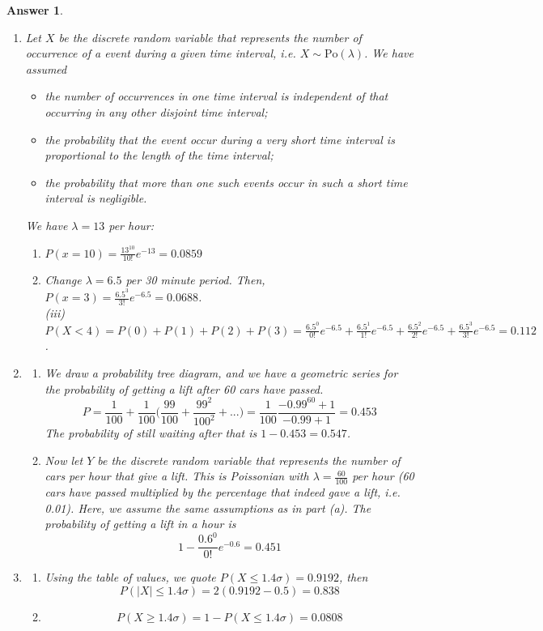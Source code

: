 \documentclass[a4paper]{article}
\newtheorem{ans}{Answer}[section]
\theoremstyle{new}
\begin{document}
\begin{ans}\leavevmode
\begin{enumerate}[label=(\alph*)]
\item Let $X$ be the discrete random variable that represents the number of occurrence of a event during a given time interval, i.e. $X\sim\text{Po}(\lambda)$. We have assumed
\begin{itemize}
    \item the number of occurrences in one time interval is independent of that occurring in any other disjoint time interval;
    \item the probability that the event occur during a very short time interval is proportional to the length of the time interval;
    \item the probability that more than one such events occur in such a short time interval is negligible.
\end{itemize}
We have $\lambda=13$ per hour:
\begin{enumerate}[label=(\roman*)]
\item $P(x=10)=\frac{13^{10}}{10!}e^{-13}=0.0859$\\[5pt]
\item Change $\lambda=6.5$ per 30 minute period. Then, $P(x=3)=\frac{6.5^3}{3!}e^{-6.5}=0.0688$.\\[5pt]
(iii) $P(X<4)=P(0)+P(1)+P(2)+P(3)=\frac{6.5^0}{0!}e^{-6.5}+\frac{6.5^1}{1!}e^{-6.5}+\frac{6.5^2}{2!}e^{-6.5}+\frac{6.5^3}{3!}e^{-6.5}=0.112$.
\end{enumerate}
\item
\begin{enumerate}[label=(\roman*)]
\item We draw a probability tree diagram, and we have a geometric series for the probability of getting a lift after 60 cars have passed.
$$P=\frac{1}{100}+\frac{1}{100}\bigg(\frac{99}{100}+\frac{99^2}{100^2}+...\bigg)=\frac{1}{100}\frac{-0.99^{60}+1}{-0.99+1}=0.453$$
The probability of still waiting after that is $1-0.453=0.547$.
\item Now let $Y$ be the discrete random variable that represents the number of cars per hour that give a lift. This is Poissonian with $\lambda=\frac{60}{100}$ per hour (60 cars have passed multiplied by the percentage that indeed gave a lift, i.e. 0.01). Here, we assume the same assumptions as in part (a). The probability of getting a lift in a hour is
$$1-\frac{0.6^0}{0!}e^{-0.6}=0.451$$
\end{enumerate}
\item 
\begin{enumerate}[label=(\roman*)]
\item Using the table of values, we quote $P(X\leq 1.4\sigma)=0.9192$, then
$$P(|X|\leq 1.4\sigma)=2(0.9192-0.5)=0.838$$
\item 
$$P(X\geq1.4\sigma)=1-P(X\leq 1.4\sigma)=0.0808$$
\end{enumerate}
\end{enumerate}
\end{ans}
\end{document}
